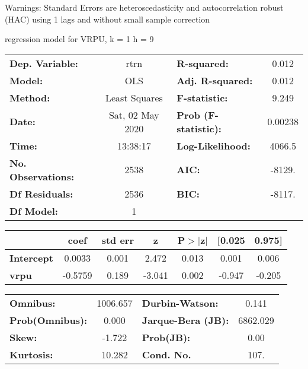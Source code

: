 Warnings: \newline
 [1] Standard Errors are heteroscedasticity and autocorrelation robust (HAC) using 1 lags and without small sample correction\ 

regression model for VRPU, k = 1 h = 9\begin{center}
\begin{tabular}{lclc}
\toprule
\textbf{Dep. Variable:}    &       rtrn       & \textbf{  R-squared:         } &     0.012   \\
\textbf{Model:}            &       OLS        & \textbf{  Adj. R-squared:    } &     0.012   \\
\textbf{Method:}           &  Least Squares   & \textbf{  F-statistic:       } &     9.249   \\
\textbf{Date:}             & Sat, 02 May 2020 & \textbf{  Prob (F-statistic):} &  0.00238    \\
\textbf{Time:}             &     13:38:17     & \textbf{  Log-Likelihood:    } &    4066.5   \\
\textbf{No. Observations:} &        2538      & \textbf{  AIC:               } &    -8129.   \\
\textbf{Df Residuals:}     &        2536      & \textbf{  BIC:               } &    -8117.   \\
\textbf{Df Model:}         &           1      & \textbf{                     } &             \\
\bottomrule
\end{tabular}
\begin{tabular}{lcccccc}
                   & \textbf{coef} & \textbf{std err} & \textbf{z} & \textbf{P$> |$z$|$} & \textbf{[0.025} & \textbf{0.975]}  \\
\midrule
\textbf{Intercept} &       0.0033  &        0.001     &     2.472  &         0.013        &        0.001    &        0.006     \\
\textbf{vrpu}      &      -0.5759  &        0.189     &    -3.041  &         0.002        &       -0.947    &       -0.205     \\
\bottomrule
\end{tabular}
\begin{tabular}{lclc}
\textbf{Omnibus:}       & 1006.657 & \textbf{  Durbin-Watson:     } &    0.141  \\
\textbf{Prob(Omnibus):} &   0.000  & \textbf{  Jarque-Bera (JB):  } & 6862.029  \\
\textbf{Skew:}          &  -1.722  & \textbf{  Prob(JB):          } &     0.00  \\
\textbf{Kurtosis:}      &  10.282  & \textbf{  Cond. No.          } &     107.  \\
\bottomrule
\end{tabular}
\end{center}

